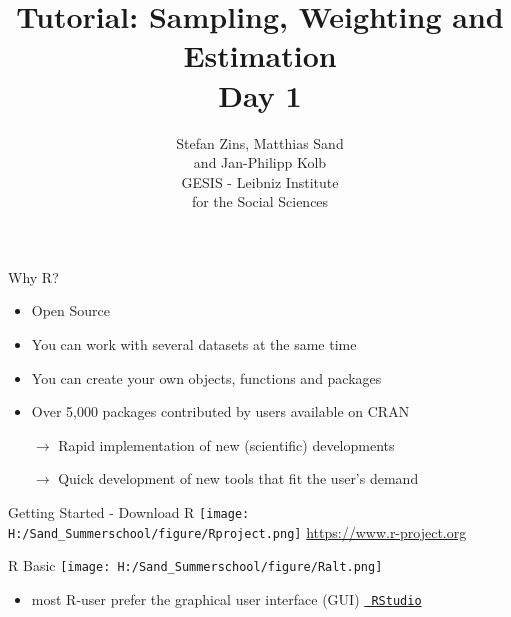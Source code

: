 \documentclass[11pt,german,hideothersubsections]{beamer}
\title[Day 1]{Tutorial: Sampling, Weighting and Estimation\\ \Large{Day 1} }
\author[M. Sand]{Stefan Zins, Matthias Sand\\ and Jan-Philipp Kolb\\ \vspace{.5cm} \footnotesize{GESIS - Leibniz Institute\\ for the Social Sciences}}
\date[]{\color{dunkelgrau}\footnotesize%
\begin{minipage}{8cm}%
\begin{center}%
\scriptsize{
\textbf{GESIS Summer School}\\ \tiny{Cologne, Germany}%
}\\
\vspace{0.25cm}
\textbf{August 24th, 2015}%

\end{center}%
\end{minipage}}%
\newcommand{\R}[1]{{\tt \color{blue}  #1}}
\begin{document}

\maketitle



\begin{frame}[fragile]{Why R?}
\begin{itemize}
\item Open Source 
\vspace{.25cm}
\item You can work with several datasets at the same time
\vspace{.25cm}
\item You can create your own objects, functions and packages
\vspace{.25cm}
\item Over 5,000 packages contributed by users available on CRAN
\vspace{.25cm}
\item[$\rightarrow$] Rapid implementation of new (scientific) developments
\vspace{.25cm}
\item[$\rightarrow$] Quick development of new tools that fit the user's demand
\end{itemize}
\end{frame}
\begin{frame}[fragile]{Getting Started - Download R}
\texttt{[image: H:/Sand\_Summerschool/figure/Rproject.png]}
\vspace{.5cm}
\centering
\url{https://www.r-project.org}

\end{frame}
\begin{frame}[fragile]{R Basic}
\texttt{[image: H:/Sand\_Summerschool/figure/Ralt.png]}
\begin{itemize}
\item most R-user prefer the graphical user interface (GUI) \href{https://www.rstudio.com}{\R{RStudio}}
\end{itemize}
\end{frame}
\end{document}
